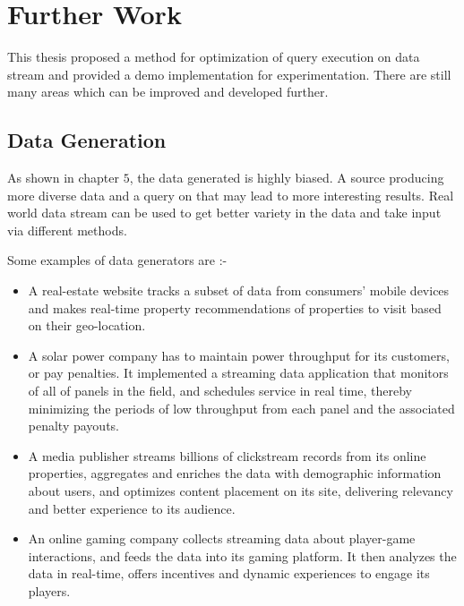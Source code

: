 \section{Further Work}
This thesis proposed a method for optimization of query execution on data stream and provided a demo implementation for experimentation. There are still many areas which can be improved and developed further.

\subsection{Data Generation}
As shown in chapter $5$, the data generated is highly biased. A source producing more diverse data and a query on that may lead to more interesting results. Real world data stream can be used to get better variety in the data and take input via different methods.
\par Some examples of data generators are :-
\begin{itemize}
    \item A real-estate website tracks a subset of data from consumers’ mobile devices and makes real-time property recommendations of properties to visit based on their geo-location.\cite{data_source}
    \item A solar power company has to maintain power throughput for its customers, or pay penalties. It implemented a streaming data application that monitors of all of panels in the field, and schedules service in real time, thereby minimizing the periods of low throughput from each panel and the associated penalty payouts. \cite{data_source}
    \item A media publisher streams billions of clickstream records from its online properties, aggregates and enriches the data with demographic information about users, and optimizes content placement on its site, delivering relevancy and better experience to its audience.\cite{data_source}
    \item An online gaming company collects streaming data about player-game interactions, and feeds the data into its gaming platform. It then analyzes the data in real-time, offers incentives and dynamic experiences to engage its players.\cite{data_source}
\end{itemize}

